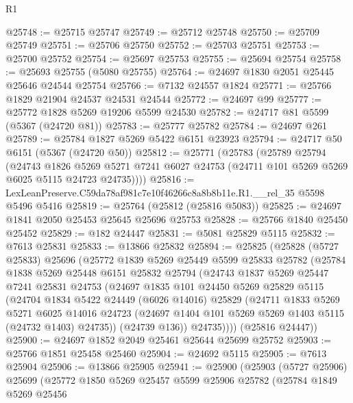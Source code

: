 \begin{lexlean}{R1}
\begin{coremodule}
@25748 := @25715 @25747
@25749 := @25712 @25748
@25750 := @25709 @25749
@25751 := @25706 @25750
@25752 := @25703 @25751
@25753 := @25700 @25752
@25754 := @25697 @25753
@25755 := @25694 @25754
@25758 := @25693 @25755 (@5080 @25755)
@25764 := @24697 @1830 @2051 @25445 @25646 @24544 @25754
@25766 := @7132 @24557 @1824
@25771 := @25766 @1829 @21904 @24537 @24531 @24544
@25772 := @24697 @99
@25777 := @25772 @1828 @5269 @19206 @5599 @24530
@25782 := @24717 @81 @5599 (@5367 (@24720 @81))
@25783 := @25777 @25782
@25784 := @24697 @261
@25789 := @25784 @1827 @5269 @5422 @6151 @23923
@25794 := @24717 @50 @6151 (@5367 (@24720 @50))
@25812 := @25771
    (@25783
      (@25789
        @25794
        (@24743
          @1826
          @5269
          @5271
          @7241
          @6027
          @24753
          (@24711 @101 @5269 @5269 @6025 @5115 @24723 @24735))))
@25816 := LexLeanPreserve.C59da78af981c7e10f46266c8a8b8b11e.R1.__rel_35 @5598 @5496 @5416
@25819 := @25764 (@25812 (@25816 @5083))
@25825 := @24697 @1841 @2050 @25453 @25645 @25696 @25753
@25828 := @25766 @1840 @25450 @25452
@25829 := @182 @24447
@25831 := @5081 @25829 @5115
@25832 := @7613 @25831
@25833 := @13866 @25832
@25894 := @25825
    (@25828
      (@5727 @25833)
      @25696
      (@25772
        @1839
        @5269
        @25449
        @5599
        @25833
        @25782
        (@25784
          @1838
          @5269
          @25448
          @6151
          @25832
          @25794
          (@24743
            @1837
            @5269
            @25447
            @7241
            @25831
            @24753
            (@24697
              @1835
              @101
              @24450
              @5269
              @25829
              @5115
              (@24704
                @1834
                @5422
                @24449
                (@6026 @14016)
                @25829
                (@24711
                  @1833
                  @5269
                  @5271
                  @6025
                  @14016
                  @24723
                  (@24697 @1404 @101 @5269 @5269 @1403 @5115 (@24732 @1403) @24735))
                (@24739 @136))
              @24735))))
      (@25816 @24447))
@25900 := @24697 @1852 @2049 @25461 @25644 @25699 @25752
@25903 := @25766 @1851 @25458 @25460
@25904 := @24692 @5115
@25905 := @7613 @25904
@25906 := @13866 @25905
@25941 := @25900
    (@25903
      (@5727 @25906)
      @25699
      (@25772
        @1850
        @5269
        @25457
        @5599
        @25906
        @25782
        (@25784
          @1849
          @5269
          @25456

\end{coremodule}
\end{lexlean}
